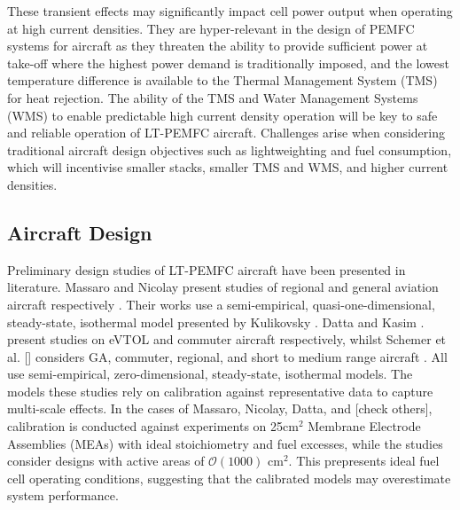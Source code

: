 These transient effects may significantly impact cell power output when operating at high current densities. They are hyper-relevant in the design of PEMFC systems for aircraft as they threaten the ability to provide sufficient power at take-off where the highest power demand is traditionally imposed, and the lowest temperature difference is available to the Thermal Management System (TMS) for heat rejection. The ability of the TMS and Water Management Systems (WMS) to enable predictable high current density operation will be key to safe and reliable operation of LT-PEMFC aircraft. Challenges arise when considering traditional aircraft design objectives such as lightweighting and fuel consumption, which will incentivise smaller stacks, smaller TMS and WMS, and higher current densities.

\subsection{Aircraft Design}
Preliminary design studies of LT-PEMFC aircraft have been presented in literature. Massaro \etal \cite{chiara_massaro_optimal_2024} and Nicolay \etal \cite{nicolay_conceptual_2021} present studies of regional and general aviation aircraft respectively . Their works use a semi-empirical, quasi-one-dimensional, steady-state, isothermal model presented by Kulikovsky \cite{kulikovsky_regimes_2010, kulikovsky_physicallybased_2013}.
Datta \cite{datta_pem_2021} and Kasim \etal. \cite{abu_kasim_performance_2022} present studies on eVTOL and commuter aircraft respectively, whilst Schemer et al. [] considers GA, commuter, regional, and short to medium range aircraft \cite{schmelcher_hydrogen_2022}. All use semi-empirical, zero-dimensional, steady-state, isothermal models.
The models these studies rely on calibration against representative data to capture multi-scale effects. In the cases of Massaro, Nicolay, Datta, and [check others], calibration is conducted against experiments on 25cm$^2$ Membrane Electrode Assemblies (MEAs) with ideal stoichiometry and fuel excesses, while the studies consider designs with active areas of $\mathcal{O}(1000)$ cm$^2$. This prepresents ideal fuel cell operating conditions, suggesting that the calibrated models may overestimate system performance.
